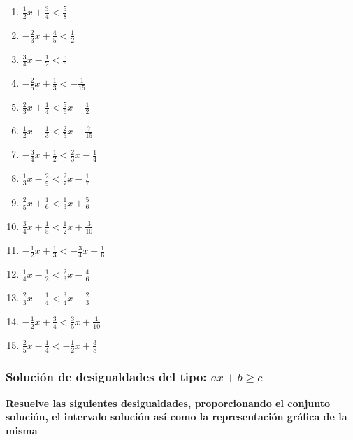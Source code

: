 \documentclass[12pt]{article}
\begin{document}
\begin{enumerate}
\def\labelenumi{\arabic{enumi}.}
\item
  \(\frac{1}{2}x+\frac{3}{4}<\frac{5}{8}\)
\item
  \(-\frac{2}{3}x+\frac{4}{5}<\frac{1}{2}\)
\item
  \(\frac{3}{4}x-\frac{1}{2}<\frac{5}{6}\)
\item
  \(-\frac{2}{5}x+\frac{1}{3}<-\frac{1}{15}\)
\item
  \(\frac{2}{3}x+\frac{1}{4}<\frac{5}{6}x-\frac{1}{2}\)
\item
  \(\frac{1}{2}x-\frac{1}{3}<\frac{2}{5}x-\frac{7}{15}\)
\item
  \(-\frac{3}{4}x+\frac{1}{2}<\frac{2}{3}x-\frac{1}{4}\)
\item
  \(\frac{1}{3}x-\frac{2}{5}<\frac{2}{7}x-\frac{1}{7}\)
\item
  \(\frac{2}{5}x+\frac{1}{6}<\frac{1}{3}x+\frac{5}{6}\)
\item
  \(\frac{3}{4}x+\frac{1}{5}<\frac{1}{2}x+\frac{3}{10}\)
\item
  \(-\frac{1}{2}x+\frac{1}{3}<-\frac{3}{4}x-\frac{1}{6}\)
\item
  \(\frac{1}{4}x-\frac{1}{2}<\frac{2}{3}x-\frac{4}{6}\)
\item
  \(\frac{2}{3}x-\frac{1}{4}<\frac{3}{4}x-\frac{2}{3}\)
\item
  \(-\frac{1}{2}x+\frac{3}{4}<\frac{3}{5}x+\frac{1}{10}\)
\item
  \(\frac{2}{5}x-\frac{1}{4}<-\frac{1}{2}x+\frac{3}{8}\)
\end{enumerate}

\subsubsection{\texorpdfstring{Solución de desigualdades del tipo:
\(ax+b \geq c\)}{Solución de desigualdades del tipo: ax+b \textbackslash geq c}}\label{soluciuxf3n-de-desigualdades-del-tipo-axb-geq-c}

\textbf{Resuelve las siguientes desigualdades, proporcionando el
conjunto solución, el intervalo solución así como la representación
gráfica de la misma}
\end{document}
